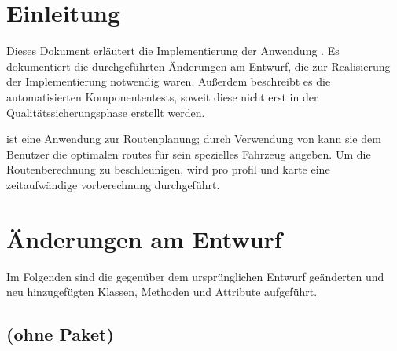 \documentclass[a4paper, 11pt]{article}
\makeatletter
\def\namedlabel#1#2{\begingroup
    #2%
    \def\@currentlabel{#2}%
    \phantomsection\label{#1}\endgroup
}
\newcommand{\none}[0]{
  \item[] keine.
}
\newcommand{\@typelabel}[1]{T:#1} %
\newcommand{\@paramlabel}[3]{P:#1.#2.#3}
\newcommand{\class}[4]{%
  \newcommand{\currentclass}[0]{#1}%
  \item[\namedlabel{\@typelabel{#1}}{\code{#1}}] #2
    \ifstrequal{#3#4}{\none\none}{%
    }{%
      \begin{description}[leftmargin=0em,itemindent=0em]
        \ifstrequal{#3}{\none}{%
        }{%
        \item[Attribute] \hfill %
          \begin{description}
            #3%
          \end{description}
        }%
        \ifstrequal{#4}{\none}{%
        }{%
        \item[Methoden] \hfill%
          \begin{description}
            #4%
          \end{description}
        }%
      \end{description}
    }%
  \let\currentclass=\undefined%
}
\newcommand{\currentmethod}[0]{#1}%
\let\currentmethod=\undefined%
\newcommand{\param}[3]{%
  \item[\namedlabel{\@paramlabel{\currentclass}{\currentmethod}{#1}}{\code{#1}}] #3 Typ:~\reftype{#2}%
}
\newcommand{\code}[1]{\texttt{#1}}
\makeatother
\begin{document}
\section{Einleitung}
Dieses Dokument erläutert die Implementierung der Anwendung \routeKIT. Es dokumentiert die durchgeführten Änderungen am Entwurf, die zur Realisierung der Implementierung notwendig waren. Außerdem beschreibt es die automatisierten Komponententests, soweit diese nicht erst in der Qualitätssicherungsphase erstellt werden.

\routeKIT ist eine Anwendung zur Routenplanung; durch Verwendung von  kann sie dem Benutzer die optimalen \glspl{route} für sein spezielles Fahrzeug angeben.
Um die Routenberechnung zu beschleunigen, wird pro \gls{profil} und \gls{karte} eine zeitaufwändige \gls{vorberechnung} durchgeführt.

\section{Änderungen am Entwurf}
Im Folgenden sind die gegenüber dem ursprünglichen Entwurf geänderten und neu hinzugefügten Klassen, Methoden und Attribute aufgeführt.

\subsection{(ohne Paket)}
\end{document}
